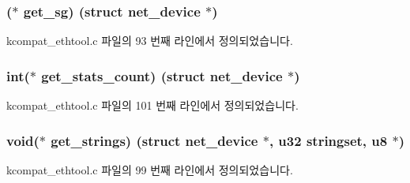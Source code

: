 \subsubsection[{\texorpdfstring{get\+\_\+sg}{get_sg}}]{($\ast$ get\+\_\+sg) (struct net\+\_\+device $\ast$)}\hypertarget{struct__kc__ethtool__ops_a640ee9efaccd8f7fa3e6db7da4e8e75f}{}\label{struct__kc__ethtool__ops_a640ee9efaccd8f7fa3e6db7da4e8e75f}


kcompat\+\_\+ethtool.\+c 파일의 93 번째 라인에서 정의되었습니다.

\subsubsection[{\texorpdfstring{get\+\_\+stats\+\_\+count}{get_stats_count}}]{\setlength{\rightskip}{0pt plus 5cm}int($\ast$ get\+\_\+stats\+\_\+count) (struct net\+\_\+device $\ast$)}\hypertarget{struct__kc__ethtool__ops_a9958b5607d069c0c0b7f4d2f4f5626fc}{}\label{struct__kc__ethtool__ops_a9958b5607d069c0c0b7f4d2f4f5626fc}


kcompat\+\_\+ethtool.\+c 파일의 101 번째 라인에서 정의되었습니다.

\subsubsection[{\texorpdfstring{get\+\_\+strings}{get_strings}}]{\setlength{\rightskip}{0pt plus 5cm}void($\ast$ get\+\_\+strings) (struct net\+\_\+device $\ast$, {\bf u32} stringset, {\bf u8} $\ast$)}\hypertarget{struct__kc__ethtool__ops_adb2e458f3cfc03d869190e5a4c2ee10e}{}\label{struct__kc__ethtool__ops_adb2e458f3cfc03d869190e5a4c2ee10e}


kcompat\+\_\+ethtool.\+c 파일의 99 번째 라인에서 정의되었습니다.

